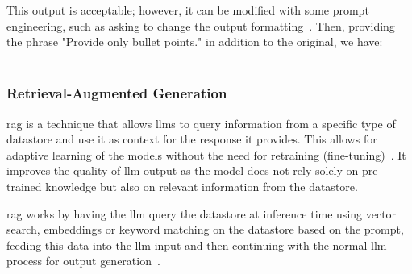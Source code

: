 This output is acceptable; however, it can be modified with some prompt engineering, such as asking
to change the output formatting~\cite{sahoo2024systematic}. Then, providing the phrase "Provide
only bullet points." in addition to the original, we have:\\

\\

\subsubsection{Retrieval-Augmented Generation}\label{subsubsec:RAG}
\Gls{rag} is a technique that allows \glspl{llm} to query information from a specific type of
datastore and use it as context for the response it provides. This allows for adaptive learning of
the models without the need for retraining (fine-tuning)~\cite{lewis2020retrieval}. It improves the
quality of \gls{llm} output as the model does not rely solely on pre-trained knowledge but also on
relevant information from the datastore.

\Gls{rag} works by having the \gls{llm} query the datastore at inference time using vector search, embeddings
or keyword matching on the datastore based on the prompt, feeding this data into the \gls{llm} input
and then continuing with the normal \gls{llm} process for output generation~\cite{gao2023retrieval}.

